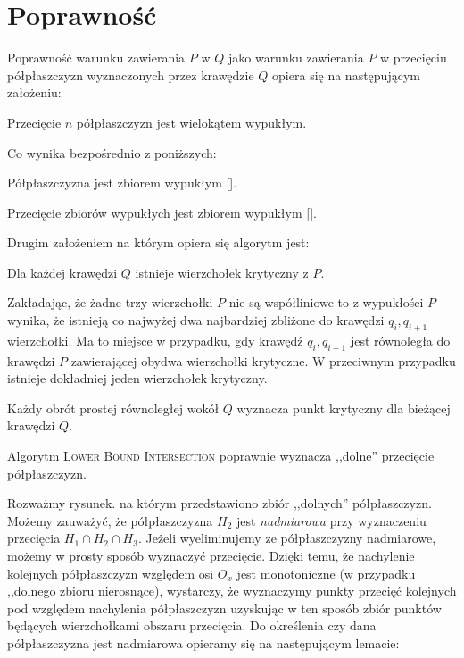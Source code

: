 \section{Poprawność}
Poprawność warunku zawierania $P$ w $Q$ jako warunku zawierania $P$ w
przecięciu półpłaszczyzn wyznaczonych przez krawędzie $Q$ opiera się
na następującym założeniu:

\begin{lemat}
  Przecięcie $n$ półpłaszczyzn jest wielokątem wypukłym.
\end{lemat}

Co wynika bezpośrednio z poniższych:

\begin{twierdzenie}
  Półpłaszczyzna jest zbiorem wypukłym [].
\end{twierdzenie}

\begin{twierdzenie}
  Przecięcie zbiorów wypukłych jest zbiorem wypukłym [].
\end{twierdzenie}

Drugim założeniem na którym opiera się algorytm jest:

\begin{lemat}
  Dla każdej krawędzi $Q$ istnieje wierzchołek krytyczny z $P$.
\end{lemat}

Zakładając, że żadne trzy wierzchołki $P$ nie są współliniowe to z
wypukłości $P$ wynika, że istnieją co najwyżej dwa najbardziej
zbliżone do krawędzi $q_i,q_{i+1}$ wierzchołki. Ma to miejsce w
przypadku, gdy krawędź $q_i,q_{i+1}$ jest równoległa do krawędzi $P$
zawierającej obydwa wierzchołki krytyczne. W przeciwnym przypadku
istnieje dokładniej jeden wierzchołek krytyczny.

\begin{lemat}
  Każdy obrót prostej równoległej wokół $Q$ wyznacza punkt krytyczny
  dla bieżącej krawędzi $Q$.
\end{lemat}

\begin{lemat}
  Algorytm \textsc{Lower Bound Intersection} poprawnie wyznacza
  ,,dolne'' przecięcie półpłaszczyzn.
\end{lemat}

Rozważmy rysunek. na którym przedstawiono zbiór ,,dolnych''
półpłaszczyzn. Możemy zauważyć, że półpłaszczyzna $H_2$ jest
\emph{nadmiarowa} przy wyznaczeniu przecięcia $H_1 \cap H_2 \cap
H_3$. Jeżeli wyeliminujemy ze półpłaszczyzny nadmiarowe, możemy w
prosty sposób wyznaczyć przecięcie. Dzięki temu, że nachylenie
kolejnych półpłaszczyzn względem osi $O_x$ jest monotoniczne (w
przypadku ,,dolnego zbioru nierosnące), wystarczy, że wyznaczymy
punkty przecięć kolejnych pod względem nachylenia półpłaszczyzn
uzyskując w ten sposób zbiór punktów będących wierzchołkami obszaru
przecięcia. Do określenia czy dana półpłaszczyzna jest nadmiarowa
opieramy się na następującym lemacie:

